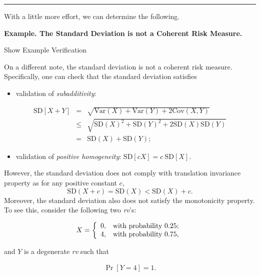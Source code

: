 \documentclass[]{book}
\providecommand{\tightlist}{%
  \setlength{\itemsep}{0pt}\setlength{\parskip}{0pt}}
\theoremstyle{definition}
\theoremstyle{definition}
\theoremstyle{definition}
\theoremstyle{remark}
\begin{document}
\begin{center}\rule{0.5\linewidth}{\linethickness}\end{center}

With a little more effort, we can determine the following.

\textbf{Example. The Standard Deviation is not a Coherent Risk Measure.}

Show Example Verification

\hypertarget{toggleExamplePortMgt.2.1}{}
On a different note, the standard deviation is not a coherent risk
measure. Specifically, one can check that the standard deviation
satisfies

\begin{itemize}
\tightlist
\item
  validation of \emph{subadditivity}:
\end{itemize}

\begin{eqnarray*} 
\mathrm{SD}[X+Y]&=&\sqrt{\mathrm{Var}(X)+\mathrm{Var}(Y)+2\mathrm{Cov}(X,Y)}\\
      &\leq& \sqrt{\mathrm{SD}(X)^2+\mathrm{SD}(Y)^2+2\mathrm{SD}(X)\mathrm{SD}(Y)}\\
      &=& \mathrm{SD}(X)+\mathrm{SD}(Y);
\end{eqnarray*}

\begin{itemize}
\tightlist
\item
  validation of \emph{positive homogeneity}:
  \(\mathrm{SD}[cX]=c~\mathrm{SD}[X]\).
\end{itemize}

However, the standard deviation does not comply with translation
invariance property as for any positive constant \(c\), \[
\mathrm{SD}(X+c)=\mathrm{SD}(X)<\mathrm{SD}(X)+c.
\] Moreover, the standard deviation also does not satisfy the
monotonicity property. To see this, consider the following two
\emph{rv}'s:

\begin{eqnarray}
X=\left\{
    \begin{array}{ll}
      0, & \hbox{with probability $0.25$;} \\
      4, & \hbox{with probability $0.75$,}
    \end{array}
  \right.
\label{eq:special-x}
\end{eqnarray}

and \(Y\) is a degenerate \emph{rv} such that

\begin{eqnarray}
\Pr[Y = 4] = 1.
\label{eq:special-y}
\end{eqnarray}
\end{document}
